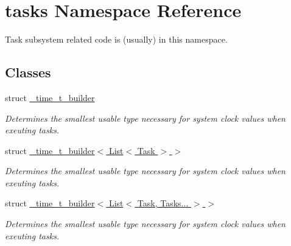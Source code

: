 \hypertarget{namespacetasks}{}\section{tasks Namespace Reference}
\label{namespacetasks}


Task subsystem related code is (usually) in this namespace.  


\subsection*{Classes}
\begin{DoxyCompactItemize}
\item 
struct \hyperlink{structtasks_1_1__time__t__builder}{\+\_\+time\+\_\+t\+\_\+builder}
\begin{DoxyCompactList}\small\item\em Determines the smallest usable type necessary for system clock values when exeuting tasks. \end{DoxyCompactList}\item 
struct \hyperlink{structtasks_1_1__time__t__builder_3_01List_3_01Task_01_4_01_4}{\+\_\+time\+\_\+t\+\_\+builder$<$ List$<$ Task $>$ $>$}
\begin{DoxyCompactList}\small\item\em Determines the smallest usable type necessary for system clock values when exeuting tasks. \end{DoxyCompactList}\item 
struct \hyperlink{structtasks_1_1__time__t__builder_3_01List_3_01Task_00_01Tasks_8_8_8_01_4_01_4}{\+\_\+time\+\_\+t\+\_\+builder$<$ List$<$ Task, Tasks... $>$ $>$}
\begin{DoxyCompactList}\small\item\em Determines the smallest usable type necessary for system clock values when exeuting tasks. \end{DoxyCompactList}\end{DoxyCompactItemize}
